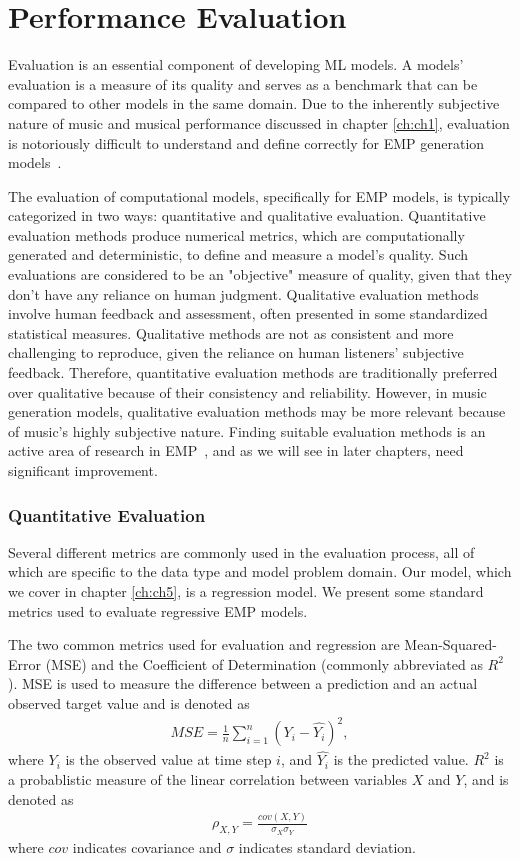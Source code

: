 \section{Performance Evaluation}\label{sec:evaluation}
Evaluation is an essential component of developing ML models. A models' evaluation is a measure of its quality and serves as a benchmark that can be compared to other models in the same domain. Due to the inherently subjective nature of music and musical performance discussed in chapter \ref{ch:ch1}, evaluation is notoriously difficult to understand and define correctly for EMP generation models~\cite{cancino2018computational}. 

The evaluation of computational models, specifically for EMP models, is typically categorized in two ways: quantitative and qualitative evaluation. Quantitative evaluation methods produce numerical metrics, which are computationally generated and deterministic, to define and measure a model's quality. Such evaluations are considered to be an "objective" measure of quality, given that they don't have any reliance on human judgment. Qualitative evaluation methods involve human feedback and assessment, often presented in some standardized statistical measures. Qualitative methods are not as consistent and more challenging to reproduce, given the reliance on human listeners' subjective feedback. Therefore, quantitative evaluation methods are traditionally preferred over qualitative because of their consistency and reliability. However, in music generation models, qualitative evaluation methods may be more relevant because of music's highly subjective nature. Finding suitable evaluation methods is an active area of research in EMP~\cite{cancino2018computational}, and as we will see in later chapters, need significant improvement. 

\subsubsection{Quantitative Evaluation}
Several different metrics are commonly used in the evaluation process, all of which are specific to the data type and model problem domain. Our model, which we cover in chapter \ref{ch:ch5}, is a regression model. We present some standard metrics used to evaluate regressive EMP models. 

The two common metrics used for evaluation and regression are Mean-Squared-Error (MSE) and the Coefficient of Determination (commonly abbreviated as $R^2$). MSE is used to measure the difference between a prediction and an actual observed target value and is denoted as 
\begin{align*}
MSE = \frac{1}{n}\sum_{i=1}^{n}(Y_i - \hat{Y_i})^2,
\end{align*}
where $Y_i$ is the observed value at time step $i$, and $\hat{Y_i}$ is the predicted value. $R^2$ is a probablistic measure of the linear correlation between variables $X$ and $Y$, and is denoted as 
\begin{align*}
\rho_{X,Y} = \frac{cov(X,Y)}{\sigma_{X}\sigma_{Y}}   
\end{align*}
where $cov$ indicates covariance and $\sigma$ indicates standard deviation.

